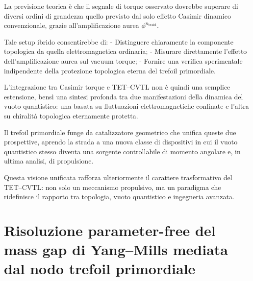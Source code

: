 \documentclass[11pt,a4paper]{article}
\theoremstyle{plain}
\theoremstyle{definition}
\begin{document}
\vspace{0.2cm}

La previsione teorica è che il segnale di torque osservato dovrebbe superare di diversi ordini di grandezza quello previsto dal solo effetto Casimir dinamico convenzionale, grazie all'amplificazione aurea $\phi^{n_{\text{braid}}}$.

\vspace{0.3cm}

Tale setup ibrido consentirebbe di:
- Distinguere chiaramente la componente topologica da quella elettromagnetica ordinaria;
- Misurare direttamente l'effetto dell'amplificazione aurea sul vacuum torque;
- Fornire una verifica sperimentale indipendente della protezione topologica eterna del trefoil primordiale.


\vspace{0.3cm}

L'integrazione tra Casimir torque e TET--CVTL non è quindi una semplice estensione, bensì una sintesi profonda tra due manifestazioni della dinamica del vuoto quantistico: una basata su fluttuazioni elettromagnetiche confinate e l'altra su chiralità topologica eternamente protetta. 


\vspace{0.3cm}


Il trefoil primordiale funge da catalizzatore geometrico che unifica queste due prospettive, aprendo la strada a una nuova classe di dispositivi in cui il vuoto quantistico stesso diventa una sorgente controllabile di momento angolare e, in ultima analisi, di propulsione.

\vspace{0.2cm}

Questa visione unificata rafforza ulteriormente il carattere trasformativo del TET--CVTL: non solo un meccanismo propulsivo, ma un paradigma che ridefinisce il rapporto tra topologia, vuoto quantistico e ingegneria avanzata.



\vspace{0.7cm}







\section{Risoluzione parameter-free del mass gap di Yang--Mills mediata dal nodo trefoil primordiale}

\vspace{0.2cm}
\end{document}
